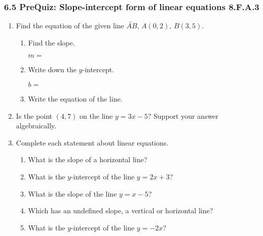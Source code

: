 

\fancyhead[LE]{\thepage}



\subsubsection*{6.5 PreQuiz: Slope-intercept form of linear equations \hfill 8.F.A.3}
\begin{enumerate}

\item Find the equation of the given line $\overleftrightarrow{AB}$, $A(0,2)$, $B(3,5)$.
\begin{multicols}{2}
    \begin{enumerate}[itemsep=0.5cm]
      \item Find the slope. \par
          $m=$
      \item Write down the $y$-intercept. \par 
        $b=$
      \item Write the equation of the line. \vspace{1cm}
      \end{enumerate}
    \begin{flushright}
    \end{flushright}
  \end{multicols}

\item Is the point $(4,7)$ on the line $y=3x-5$? Support your answer algebraically. \vspace{3cm}

\item Complete each statement about linear equations.
\begin{enumerate}[itemsep=0.25cm]
  \item What is the slope of a horizontal line?
  \item What is the $y$-intercept of the line $y = 2x + 3$?
  \item What is the slope of the line $y = x - 5$?
  \item Which has an undefined slope, a vertical or horizontal line?
  \item What is the $y$-intercept of the line $y = -2x$?
\end{enumerate} \vspace{0.5cm}


\end{enumerate}
